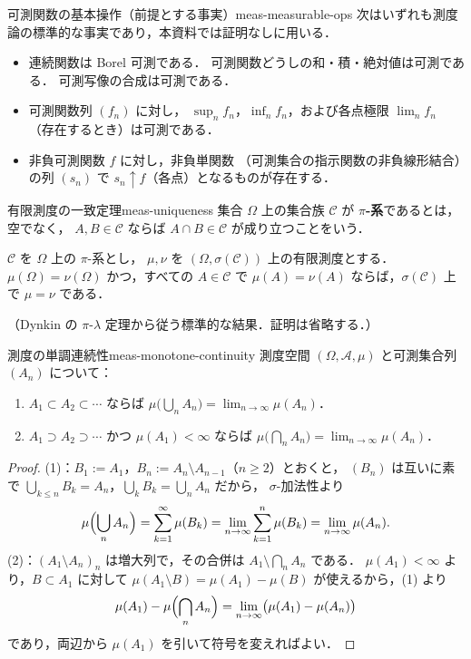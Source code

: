 \begin{remark}{可測関数の基本操作（前提とする事実）}{meas-measurable-ops}
  次はいずれも測度論の標準的な事実であり，本資料では証明なしに用いる．
  \begin{itemize}
    \item 連続関数は Borel 可測である．
      可測関数どうしの和・積・絶対値は可測である．
      可測写像の合成は可測である．
    \item 可測関数列 $(f_n)$ に対し，
      $\sup_n f_n$，$\inf_n f_n$，および各点極限 $\lim_n f_n$
      （存在するとき）は可測である．
    \item 非負可測関数 $f$ に対し，非負単関数
      （可測集合の指示関数の非負線形結合）の列 $(s_n)$ で
      $s_n\uparrow f$（各点）となるものが存在する．
  \end{itemize}
\end{remark}

\begin{theorem}{有限測度の一致定理}{meas-uniqueness}
  集合 $\Omega$ 上の集合族 $\mathcal{C}$ が
  \textbf{$\pi$-系}であるとは，空でなく，
  $A,B\in\mathcal{C}$ ならば $A\cap B\in\mathcal{C}$
  が成り立つことをいう．

  $\mathcal{C}$ を $\Omega$ 上の $\pi$-系とし，
  $\mu,\nu$ を $(\Omega,\sigma(\mathcal{C}))$ 上の有限測度とする．
  $\mu(\Omega)=\nu(\Omega)$ かつ，すべての $A\in\mathcal{C}$ で
  $\mu(A)=\nu(A)$ ならば，$\sigma(\mathcal{C})$ 上で $\mu=\nu$ である．

  （Dynkin の $\pi$-$\lambda$ 定理から従う標準的な結果．証明は省略する．）
\end{theorem}

\begin{claim}{測度の単調連続性}{meas-monotone-continuity}
  測度空間 $(\Omega,\mathcal{A},\mu)$ と可測集合列 $(A_n)$ について：
  \begin{enumerate}
    \item $A_1\subset A_2\subset\cdots$ ならば
      $\mu\bigl(\bigcup_nA_n\bigr)=\lim_{n\to\infty}\mu(A_n)$．
    \item $A_1\supset A_2\supset\cdots$ かつ $\mu(A_1)<\infty$ ならば
      $\mu\bigl(\bigcap_nA_n\bigr)=\lim_{n\to\infty}\mu(A_n)$．
  \end{enumerate}
\end{claim}

\begin{proof}
  (1)：$B_1:=A_1$，$B_n:=A_n\setminus A_{n-1}$（$n\geq2$）とおくと，
  $(B_n)$ は互いに素で
  $\bigcup_{k\leq n}B_k=A_n$，$\bigcup_kB_k=\bigcup_nA_n$ だから，
  $\sigma$-加法性より
  \[
    \mu\Bigl(\bigcup_nA_n\Bigr)
    =\sum_{k=1}^\infty\mu(B_k)
    =\lim_{n\to\infty}\sum_{k=1}^n\mu(B_k)
    =\lim_{n\to\infty}\mu(A_n).
  \]
  (2)：$(A_1\setminus A_n)_n$ は増大列で，その合併は
  $A_1\setminus\bigcap_nA_n$ である．
  $\mu(A_1)<\infty$ より，$B\subset A_1$ に対して
  $\mu(A_1\setminus B)=\mu(A_1)-\mu(B)$ が使えるから，(1) より
  \[
    \mu(A_1)-\mu\Bigl(\bigcap_nA_n\Bigr)
    =\lim_{n\to\infty}\bigl(\mu(A_1)-\mu(A_n)\bigr)
  \]
  であり，両辺から $\mu(A_1)$ を引いて符号を変えればよい．
\end{proof}

